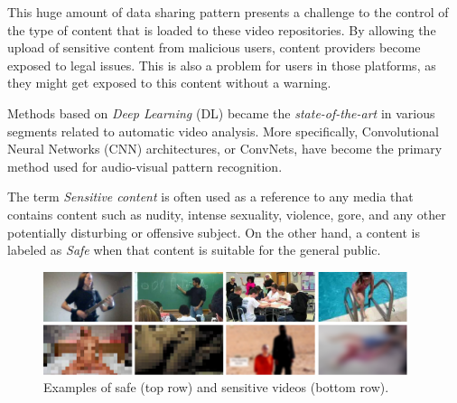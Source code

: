 This huge amount of data sharing pattern presents a challenge to the control of the type of content that is loaded to these video repositories. By allowing the upload of sensitive content from malicious users, content providers become exposed to legal issues. This is also a problem for users in those platforms, as they might get exposed to this content without a warning.

Methods based on \textit{Deep Learning} (DL) became the \textit{state-of-the-art} in various segments related to automatic video analysis. More specifically, 
Convolutional Neural Networks (CNN) architectures, or ConvNets, have become the primary method used for audio-visual pattern recognition.

The term \emph{Sensitive content} is often used as a reference to any media that contains content such as nudity, intense sexuality, violence, gore, and any other potentially disturbing or offensive subject.
On the other hand, a content is labeled as \emph{Safe} when that content is suitable for the general public.


\begin{figure}[!ht]
    \centering
    \includegraphics[width=0.95\textwidth]{img/safe-sensitive-horizontal.png}
    \caption{Examples of safe (top row) and sensitive videos (bottom row).}
    \label{fig:samples}
    \vspace{-1em}
\end{figure}


